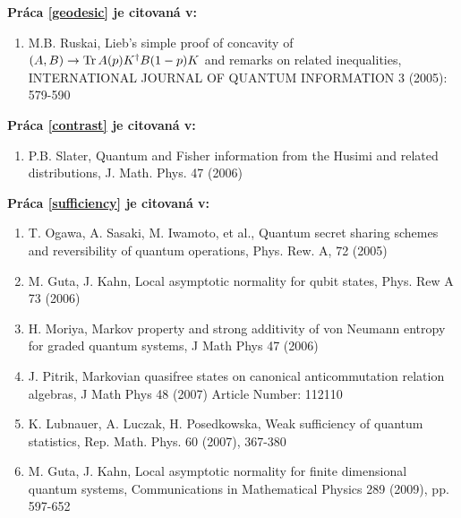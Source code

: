 \documentclass[A4paper]{article}
\begin{document}
{\bf Pr\'aca \ref{geodesic} je citovan\'a v:}
\begin{enumerate}
\setcounter{enumi}{\value{poo}}

\item  M.B. Ruskai, Lieb's simple proof of concavity of $(A, B) \to
{\rm Tr}\, A(p) K^\dagger B(1-p)K$ and remarks on related inequalities,
INTERNATIONAL JOURNAL OF QUANTUM INFORMATION 3 (2005): 579-590
\setcounter{poo}{\value{enumi}}

\end{enumerate}
{\bf Pr\'aca \ref{contrast} je citovan\'a v:}

\begin{enumerate}
\setcounter{enumi}{\value{poo}}

\item  P.B. Slater, 
Quantum and Fisher information from the Husimi and related distributions,
J.  Math.  Phys.  47 (2006) 
\setcounter{poo}{\value{enumi}}

\end{enumerate}

{\bf Pr\'aca \ref{sufficiency} je citovan\'a v:}

\begin{enumerate}
\setcounter{enumi}{\value{poo}}
\item  T. Ogawa, A. Sasaki, M. Iwamoto, et al., Quantum secret
sharing schemes and reversibility of quantum operations, Phys.
Rew. A, 72 (2005)

\item  M. Guta, J. Kahn, Local asymptotic normality for qubit states,
Phys. Rew  A 73 (2006)

\item  H. Moriya,
Markov property and strong additivity of von Neumann entropy for graded quantum systems,  J Math Phys 47 (2006) 

\item  J. Pitrik, Markovian quasifree states on canonical anticommutation relation algebras, J Math Phys 48 (2007) Article Number: 112110

\item  K. Lubnauer, A. Luczak,  H. Posedkowska,
Weak sufficiency of quantum statistics, Rep. Math. Phys. 60 (2007), 367-380  

\item  M. Guta, J. Kahn, Local asymptotic normality for finite dimensional
quantum systems, Communications in Mathematical Physics 289 (2009), pp. 597-652
\setcounter{poo}{\value{enumi}}

\end{enumerate}
\end{document}

